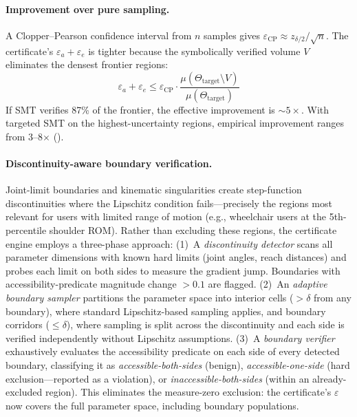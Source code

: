 \documentclass[11pt,letterpaper]{article}
\newcommand{\eps}{\varepsilon}
\newcommand{\param}{\Theta}
\begin{document}
\paragraph{Improvement over pure sampling.}
A Clopper--Pearson confidence interval from $n$ samples gives $\eps_{\mathrm{CP}} \approx z_{\delta/2}/\sqrt{n}$.
The certificate's $\eps_a + \eps_e$ is tighter because the symbolically verified volume $V$ eliminates the densest frontier regions:
\begin{equation}
\eps_a + \eps_e \leq \eps_{\mathrm{CP}} \cdot \frac{\mu(\param_{\mathrm{target}} \setminus V)}{\mu(\param_{\mathrm{target}})}
\end{equation}
If SMT verifies 87\% of the frontier, the effective improvement is $\sim\!5\times$.
With targeted SMT on the highest-uncertainty regions, empirical improvement ranges from 3--8$\times$ ().

\paragraph{Discontinuity-aware boundary verification.}
Joint-limit boundaries and kinematic singularities create step-function discontinuities where the Lipschitz condition fails---precisely the regions most relevant for users with limited range of motion (e.g., wheelchair users at the 5th-percentile shoulder ROM).
Rather than excluding these regions, the certificate engine employs a three-phase approach:
(1)~A \emph{discontinuity detector} scans all parameter dimensions with known hard limits (joint angles, reach distances) and probes each limit on both sides to measure the gradient jump.
Boundaries with accessibility-predicate magnitude change $> 0.1$ are flagged.
(2)~An \emph{adaptive boundary sampler} partitions the parameter space into interior cells ($> \delta$ from any boundary), where standard Lipschitz-based sampling applies, and boundary corridors ($\leq \delta$), where sampling is split across the discontinuity and each side is verified independently without Lipschitz assumptions.
(3)~A \emph{boundary verifier} exhaustively evaluates the accessibility predicate on each side of every detected boundary, classifying it as \emph{accessible-both-sides} (benign), \emph{accessible-one-side} (hard exclusion---reported as a violation), or \emph{inaccessible-both-sides} (within an already-excluded region).
This eliminates the measure-zero exclusion: the certificate's $\eps$ now covers the full parameter space, including boundary populations.
\end{document}
